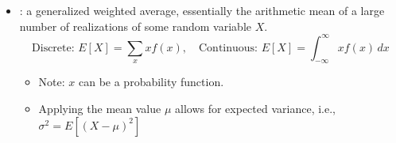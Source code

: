 \documentclass[basic]{nosvagor-notes}
\begin{document}
  \hrulefill

  \begin{itemize}
    \item {}: a generalized weighted
      average, essentially the arithmetic mean of a large number of
      realizations of some random variable \(X\).
      \[%
        \text{Discrete: } E[X] = \sum_{x}^{} x f(x), \quad \text{Continuous: }
        E[X] = \int_{-\infty}^{\infty} x f(x)\, dx
      \]%
    \begin{itemize}
      \item Note: \(x\) can be a probability function.
      \item Applying the mean value \(\mu\) allows for expected variance, i.e.,
        \(\sigma^2 = E[(X-\mu)^2]\)
    \end{itemize}

  \end{itemize}

\end{document}
